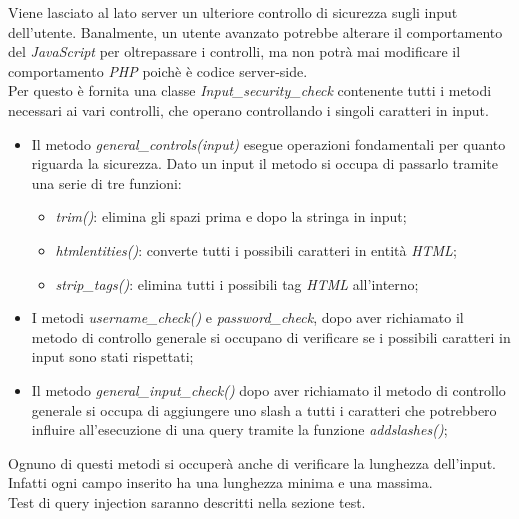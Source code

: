 Viene lasciato al lato server un ulteriore controllo di sicurezza sugli input dell'utente. Banalmente, un utente avanzato potrebbe alterare il comportamento
del \emph{JavaScript} per oltrepassare i controlli, ma non potrà mai modificare il comportamento \emph{PHP} poichè è codice server-side.\\
Per questo è fornita una classe \emph{Input\_security\_check} contenente tutti i metodi necessari ai vari controlli, che operano controllando i singoli caratteri in input.
\begin{itemize}
    \item Il metodo \emph{general\_controls(input)} esegue operazioni fondamentali per quanto riguarda la sicurezza. Dato un input il metodo si occupa di passarlo tramite una serie di tre funzioni: 
    \begin{itemize}
        \item \emph{trim()}: elimina gli spazi prima e dopo la stringa in input;
        \item \emph{htmlentities()}: converte tutti i possibili caratteri in entità \emph{HTML};
        \item \emph{strip\_tags()}: elimina tutti i possibili tag \emph{HTML} all'interno;
    \end{itemize}
    \item I metodi \emph{username\_check()} e \emph{password\_check}, dopo aver richiamato il metodo di controllo generale si occupano di verificare se i possibili caratteri in input sono stati rispettati;
    \item Il metodo \emph{general\_input\_check()} dopo aver richiamato il metodo di controllo generale si occupa di aggiungere uno slash a tutti i caratteri che potrebbero influire all'esecuzione di una query tramite la funzione \emph{addslashes()};
\end{itemize}

Ognuno di questi metodi si occuperà anche di verificare la lunghezza dell'input. Infatti ogni campo inserito ha una lunghezza minima e una massima.\\

Test di query injection saranno descritti nella sezione test.
